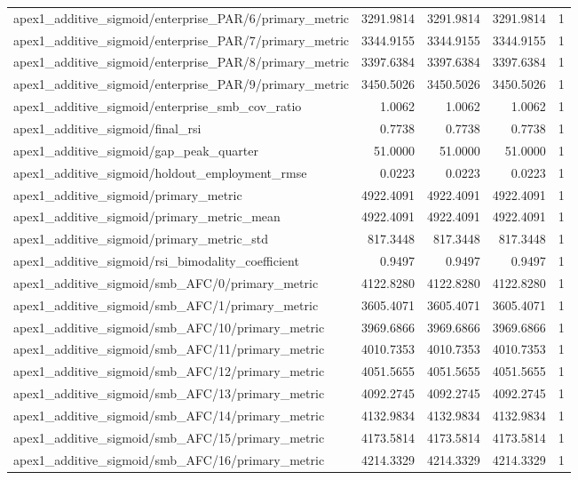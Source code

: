 \begin{table}[h]
\begin{tabular}{lrrrr}
apex1_additive_sigmoid/enterprise_PAR/6/primary_metric & 3291.9814 & 3291.9814 & 3291.9814 & 1 \\
apex1_additive_sigmoid/enterprise_PAR/7/primary_metric & 3344.9155 & 3344.9155 & 3344.9155 & 1 \\
apex1_additive_sigmoid/enterprise_PAR/8/primary_metric & 3397.6384 & 3397.6384 & 3397.6384 & 1 \\
apex1_additive_sigmoid/enterprise_PAR/9/primary_metric & 3450.5026 & 3450.5026 & 3450.5026 & 1 \\
apex1_additive_sigmoid/enterprise_smb_cov_ratio & 1.0062 & 1.0062 & 1.0062 & 1 \\
apex1_additive_sigmoid/final_rsi & 0.7738 & 0.7738 & 0.7738 & 1 \\
apex1_additive_sigmoid/gap_peak_quarter & 51.0000 & 51.0000 & 51.0000 & 1 \\
apex1_additive_sigmoid/holdout_employment_rmse & 0.0223 & 0.0223 & 0.0223 & 1 \\
apex1_additive_sigmoid/primary_metric & 4922.4091 & 4922.4091 & 4922.4091 & 1 \\
apex1_additive_sigmoid/primary_metric_mean & 4922.4091 & 4922.4091 & 4922.4091 & 1 \\
apex1_additive_sigmoid/primary_metric_std & 817.3448 & 817.3448 & 817.3448 & 1 \\
apex1_additive_sigmoid/rsi_bimodality_coefficient & 0.9497 & 0.9497 & 0.9497 & 1 \\
apex1_additive_sigmoid/smb_AFC/0/primary_metric & 4122.8280 & 4122.8280 & 4122.8280 & 1 \\
apex1_additive_sigmoid/smb_AFC/1/primary_metric & 3605.4071 & 3605.4071 & 3605.4071 & 1 \\
apex1_additive_sigmoid/smb_AFC/10/primary_metric & 3969.6866 & 3969.6866 & 3969.6866 & 1 \\
apex1_additive_sigmoid/smb_AFC/11/primary_metric & 4010.7353 & 4010.7353 & 4010.7353 & 1 \\
apex1_additive_sigmoid/smb_AFC/12/primary_metric & 4051.5655 & 4051.5655 & 4051.5655 & 1 \\
apex1_additive_sigmoid/smb_AFC/13/primary_metric & 4092.2745 & 4092.2745 & 4092.2745 & 1 \\
apex1_additive_sigmoid/smb_AFC/14/primary_metric & 4132.9834 & 4132.9834 & 4132.9834 & 1 \\
apex1_additive_sigmoid/smb_AFC/15/primary_metric & 4173.5814 & 4173.5814 & 4173.5814 & 1 \\
apex1_additive_sigmoid/smb_AFC/16/primary_metric & 4214.3329 & 4214.3329 & 4214.3329 & 1 \\

\end{tabular}
\end{table}
